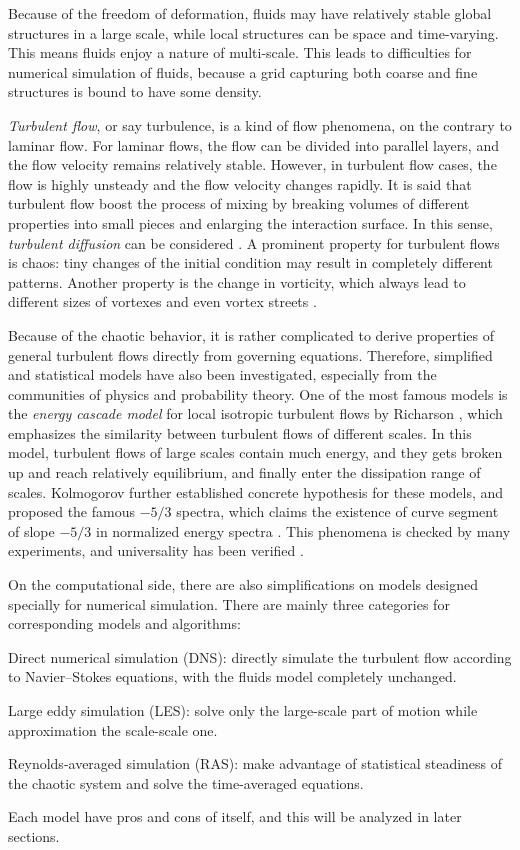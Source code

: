 \documentclass[english, nochinese]{pkupaper}
\begin{document}
Because of the freedom of deformation, fluids may have relatively stable global structures in a large scale, while local structures can be space and time-varying. This means fluids enjoy a nature of multi-scale. This leads to difficulties for numerical simulation of fluids, because a grid capturing both coarse and fine structures is bound to have some density.

\emph{Turbulent flow}, or say turbulence, is a kind of flow phenomena, on the contrary to laminar flow. For laminar flows, the flow can be divided into parallel layers, and the flow velocity remains relatively stable. However, in turbulent flow cases, the flow is highly unsteady and the flow velocity changes rapidly. It is said that turbulent flow boost the process of mixing by breaking volumes of different properties into small pieces and enlarging the interaction surface. In this sense, \emph{turbulent diffusion} can be considered \parencite{ferziger_computational_2002}. A prominent property for turbulent flows is chaos: tiny changes of the initial condition may result in completely different patterns. Another property is the change in vorticity, which always lead to different sizes of vortexes and even vortex streets \parencite{ferziger_computational_2002}.

Because of the chaotic behavior, it is rather complicated to derive properties of general turbulent flows directly from governing equations. Therefore, simplified and statistical models have also been investigated, especially from the communities of physics and probability theory. One of the most famous models is the \emph{energy cascade model} for local isotropic turbulent flows by Richarson \parencite{taylor_diffusion_nodate}, which emphasizes the similarity between turbulent flows of different scales. In this model, turbulent flows of large scales contain much energy, and they gets broken up and reach relatively equilibrium, and finally enter the dissipation range of scales. Kolmogorov further established concrete hypothesis for these models, and proposed the famous $ -5 / 3 $ spectra, which claims the existence of curve segment of slope $ -5 / 3 $ in normalized energy spectra \parencite{kolmogorov_equations_1941}. This phenomena is checked by many experiments, and universality has been verified \parencite{sreenivasan_universality_1995}.

On the computational side, there are also simplifications on models designed specially for numerical simulation. There are mainly three categories for corresponding models and algorithms:
\begin{partlist}
\item Direct numerical simulation (DNS): directly simulate the turbulent flow according to Navier--Stokes equations, with the fluids model completely unchanged.
\item Large eddy simulation (LES): solve only the large-scale part of motion while approximation the scale-scale one.
\item Reynolds-averaged simulation (RAS): make advantage of statistical steadiness of the chaotic system and solve the time-averaged equations.
\end{partlist}
Each model have pros and cons of itself, and this will be analyzed in later sections.
\end{document}
